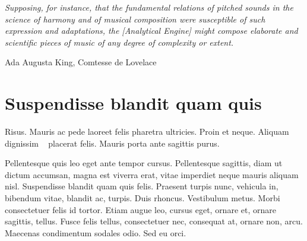 \documentclass[../hdr.tex]{subfiles}
\begin{document}
\label{chap:part2-intro}

  \epigraph{\itshape 
    Supposing, for instance, that the fundamental relations of pitched sounds in
    the science of harmony and of musical composition were susceptible of such
    expression and adaptations, the [Analytical Engine] might compose elaborate
    and scientific pieces of music of any degree of complexity or extent.
  }{Ada Augusta King, Comtesse de Lovelace\footnotemark[1]}
\addtocounter{footnote}{1}

\ifSubfilesClassLoaded{%
  \vskip-1.8cm
  \renewcommand{\contentsname}{}
  \setcounter{secnumdepth}{2}
  \setcounter{tocdepth}{2}
  \tableofcontents
  \begin{center}
  \par\noindent\rule{.4\textwidth}{0.4pt}
  \end{center}
  \vskip-1cm
}{%
  \minitoc
}
\vskip2cm

\section{Suspendisse blandit quam quis}

Risus. Mauris ac pede laoreet felis pharetra ultricies. Proin et neque. Aliquam
dignissim \footnotemark~\cite{serra2013roadmap} placerat felis. Mauris porta ante sagittis purus.

Pellentesque quis leo eget ante tempor cursus. Pellentesque sagittis, diam ut
dictum accumsan, magna est viverra erat, vitae imperdiet neque mauris aliquam
nisl. Suspendisse blandit quam quis felis. Praesent turpis nunc, vehicula in,
bibendum vitae, blandit ac, turpis. Duis rhoncus. Vestibulum metus. Morbi
consectetuer felis id tortor. Etiam augue leo, cursus eget, ornare et, ornare
sagittis, tellus. Fusce felis tellus, consectetuer nec, consequat at, ornare
non, arcu. Maecenas condimentum sodales odio. Sed eu orci.
\end{document}
